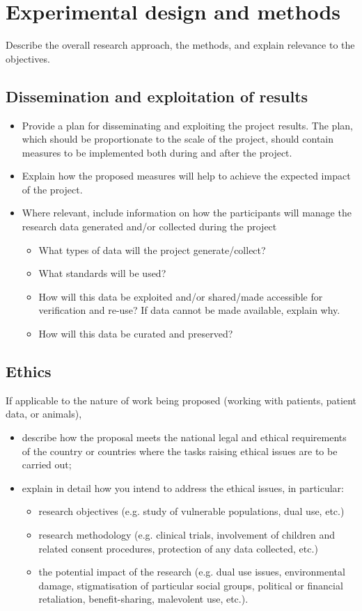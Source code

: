 \documentclass[11pt]{article} %
\begin{document}
\section{Experimental design and methods}
Describe the overall research approach, the methods, and explain relevance to the objectives.  


\subsection{Dissemination and exploitation of results}
\begin{itemize}
\item Provide a plan for disseminating and exploiting the project results. The plan, which should be proportionate to the scale of the project, should contain measures to be implemented both during and after the project. 
\item Explain how the proposed measures will help to achieve the expected impact of the project. 
\item Where relevant, include information on how the participants will manage the research data generated and/or collected during the project
\begin{itemize}
\item What types of data will the project generate/collect?
\item What standards will be used?
\item How will this data be exploited and/or shared/made accessible for verification and re-use? If data cannot be made available, explain why.
\item How will this data be curated and preserved?
\end{itemize}
\end{itemize}

\subsection{Ethics}
If applicable to the nature of work being proposed (working with patients, patient data, or animals),
\begin{itemize}
\item describe how the proposal meets the national legal and ethical requirements of the country or countries where the tasks raising ethical issues are to be carried out; 
\item explain in detail how you intend to address the ethical issues, in particular:
\begin{itemize}
\item research objectives (e.g. study of vulnerable populations, dual use, etc.)
\item research methodology (e.g. clinical trials, involvement of children and related consent procedures, protection of any data collected, etc.) 
\item the potential impact of the research (e.g. dual use issues, environmental damage, stigmatisation of particular social groups, political or financial retaliation, benefit-sharing,  malevolent use, etc.).
\end{itemize}
\end{itemize}
\end{document}
